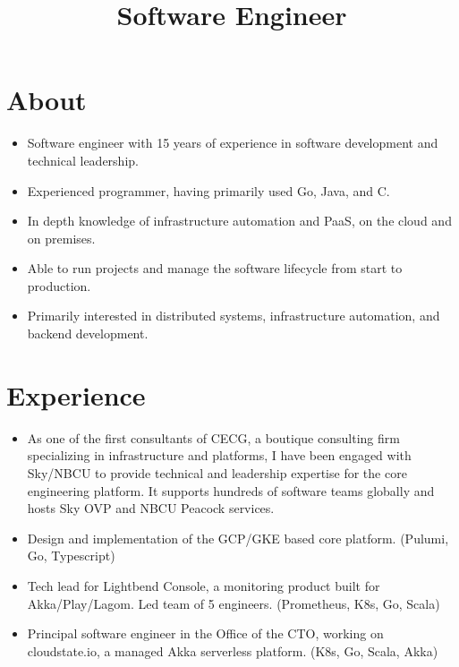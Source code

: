 \documentclass[11pt,a4paper,roman]{moderncv}
\title{Software Engineer}
\begin{document}
\makecvtitle{}

\section{About}
\begin{itemize}
  \item Software engineer with 15 years of experience in software development and technical leadership.
  \item Experienced programmer, having primarily used Go, Java, and C.
  \item In depth knowledge of infrastructure automation and PaaS, on the cloud and on premises.
  \item Able to run projects and manage the software lifecycle from start to production.
  \item Primarily interested in distributed systems, infrastructure automation, and backend development.
\end{itemize}

\section{Experience}

\begin{itemize}
  \item As one of the first consultants of CECG, a boutique consulting firm specializing in infrastructure and
        platforms, I have been engaged with Sky/NBCU to provide technical and leadership expertise for the core engineering
        platform.  It supports hundreds of software teams globally and hosts Sky OVP and NBCU Peacock services.
  \item Design and implementation of the GCP/GKE based core platform. (Pulumi, Go, Typescript)
\end{itemize}

\vspace{5mm}

\begin{itemize}
  \item Tech lead for Lightbend Console, a monitoring product built for Akka/Play/Lagom. Led
        team of 5 engineers. (Prometheus, K8s, Go, Scala)
  \item Principal software engineer in the Office of the CTO, working on cloudstate.io, a managed Akka serverless platform.
        (K8s, Go, Scala, Akka)
\end{itemize}
\end{document}
